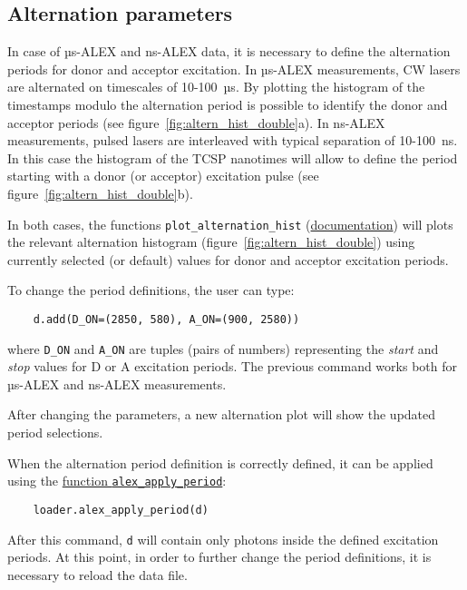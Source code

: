 \subsection{Alternation parameters}
\label{sec:alternation}

In case of µs-ALEX and ns-ALEX data, it is necessary to define the
alternation periods for donor and acceptor excitation. 
In µs-ALEX measurements, CW lasers are alternated on timescales of 10-100~µs.
By plotting the histogram of the timestamps modulo the alternation period
is possible to identify the donor and acceptor periods (see figure~\ref{fig:altern_hist_double}a).
In ns-ALEX measurements, pulsed lasers are interleaved with typical separation of 10-100~ns.
In this case the histogram of the TCSP nanotimes will allow to define the period
starting with a donor (or acceptor) excitation pulse (see figure~\ref{fig:altern_hist_double}b).

In both cases, the functions
\verb|plot_alternation_hist| (\href{http://fretbursts.readthedocs.org/en/latest/plots.html#fretbursts.burst\_plot.plot\_alternation\_hist}{documentation})
will plots the relevant alternation histogram (figure~\ref{fig:altern_hist_double}) 
using currently selected (or default) values for donor and acceptor excitation periods.

To change the period definitions, the user can type:

\begin{lstlisting}
    d.add(D_ON=(2850, 580), A_ON=(900, 2580))
\end{lstlisting}

where \verb|D_ON| and \verb|A_ON| are tuples (pairs of numbers) representing
the \textit{start} and \textit{stop} values for D or A excitation periods.
The previous command works both for µs-ALEX and ns-ALEX measurements.

After changing the parameters, a new alternation plot will show the updated 
period selections.

When the alternation period definition is correctly defined, it can
be applied using the
\href{http://fretbursts.readthedocs.org/en/latest/loader.html#fretbursts.loader.alex_apply_period}{function \texttt{alex\_apply\_period}}:

\begin{lstlisting}
    loader.alex_apply_period(d)
\end{lstlisting}

After this command, \verb|d| will contain only photons inside the defined excitation periods. 
At this point, in order to further change the period definitions,
it is necessary to reload the data file.
